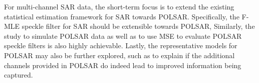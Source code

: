 For multi-channel SAR data, the short-term focus is to extend the existing statistical estimation framework for SAR towards POLSAR.
Specifically, the F-MLE speckle filter for SAR should be extensible towards POLSAR,
Similarly, the study to simulate POLSAR data as well as to use MSE to evaluate POLSAR speckle filters is also highly achievable.
Lastly, the representative models for POLSAR may also be further explored, such as to explain if the additional channels provided in POLSAR do indeed lead to improved information being captured.  
       
%
%
